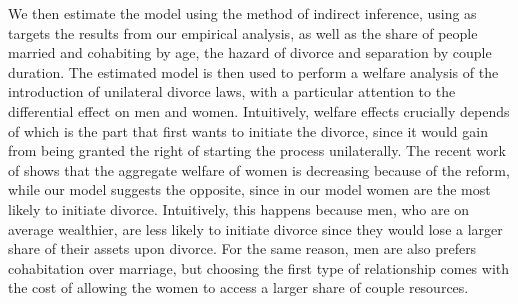 \documentclass[12pt]{article}
\numberwithin{table}{section}
\begin{document}
We then estimate the model using the method of indirect inference, using as targets the results from our empirical analysis, as well as the share of people married and cohabiting by age, the hazard of divorce and separation by couple duration. The estimated model is then used to perform a welfare analysis of the introduction of unilateral divorce laws, with a particular attention to the differential effect on men and women. Intuitively, welfare effects crucially depends of which is the part that first wants to initiate the divorce, since it would gain from being granted the right of starting the process unilaterally. The recent work of \citet{fernandez2017} shows that the aggregate welfare of women is decreasing because of the reform, while our model suggests the opposite, since in our model women are the most likely to initiate divorce. Intuitively, this happens because men, who are on average wealthier, are less likely to initiate divorce since they would lose a larger share of their assets upon divorce. For the same reason, men are also prefers cohabitation over marriage, but choosing the first type of relationship comes with the cost of allowing the women to access a larger share of couple resources.




\end{document}
